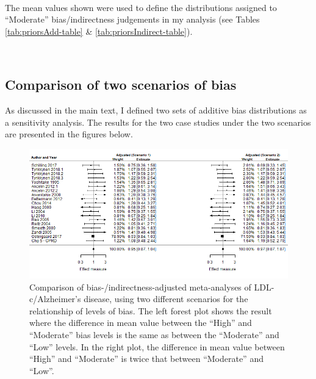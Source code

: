 \documentclass[a4paper, twoside]{templates/ociamthesis}
\begin{document}
~

The mean values shown were used to define the distributions assigned to ``Moderate'' bias/indirectness judgements in my analysis (see Tables \ref{tab:priorsAdd-table} \& \ref{tab:priorsIndirect-table}).

~

\hypertarget{comparison-of-two-scenarios-of-bias}{%
\subsection{Comparison of two scenarios of bias}\label{comparison-of-two-scenarios-of-bias}}

As discussed in the main text, I defined two sets of additive bias distributions as a sensitivity analysis. The results for the two case studies under the two scenarios are presented in the figures below.





\begin{figure}[H]
\includegraphics[width=1\linewidth]{figures/tri/fp_paired_midlife_ldl_ad_scenarios} \caption[Comparison of bias-/indirectness-adjusted meta-analyses under two different scenarios of prior distributions of bias.]{Comparison of bias-/indirectness-adjusted meta-analyses of LDL-c/Alzheimer's disease, using two different scenarios for the relationship of levels of bias. The left forest plot shows the result where the difference in mean value between the ``High'' and ``Moderate'' bias levels is the same as between the ``Moderate'' and ``Low'' levels. In the right plot, the difference in mean value between ``High'' and ``Moderate'' is twice that between ``Moderate'' and ``Low''.}\label{fig:fpLdlAdComparison}
\end{figure}
\end{document}
